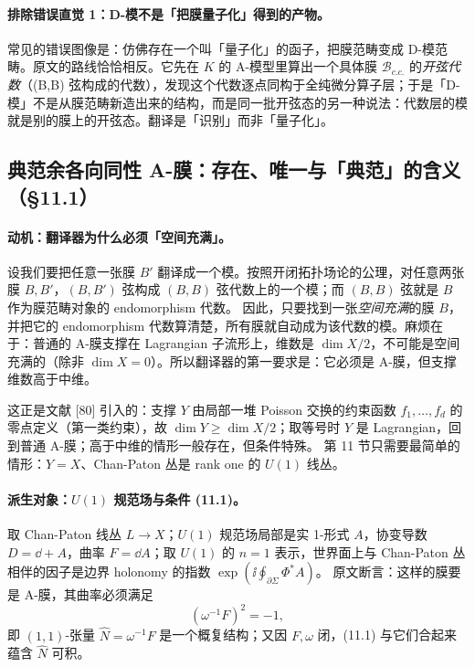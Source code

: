 \paragraph{排除错误直觉 1：D-模不是「把膜量子化」得到的产物。}常见的错误图像是：仿佛存在一个叫「量子化」的函子，把膜范畴变成 D-模范畴。原文的路线恰恰相反。它先在 \(K\) 的 A-模型里算出一个具体膜 \(\mathcal B_{c.c.}\) 的\emph{开弦代数}（(B,B) 弦构成的代数），发现这个代数逐点同构于全纯微分算子层；于是「D-模」不是从膜范畴新造出来的结构，而是同一批开弦态的另一种说法：代数层的模就是别的膜上的开弦态。翻译是「识别」而非「量子化」。\pA{}\pC{}

\subsection{典范余各向同性 A-膜：存在、唯一与「典范」的含义（\S11.1）}
\label{subsec:cc}

\paragraph{动机：翻译器为什么必须「空间充满」。}设我们要把任意一张膜 \(B'\) 翻译成一个模。按照开闭拓扑场论的公理，对任意两张膜 \(B,B'\)，\((B,B')\) 弦构成 \((B,B)\) 弦代数上的一个模；而 \((B,B)\) 弦就是 \(B\) 作为膜范畴对象的 endomorphism 代数。\pA{} 因此，只要找到一张\emph{空间充满}的膜 \(B\)，并把它的 endomorphism 代数算清楚，所有膜就自动成为该代数的模。麻烦在于：普通的 A-膜支撑在 Lagrangian 子流形上，维数是 \(\dim X/2\)，不可能是空间充满的（除非 \(\dim X=0\)）。所以翻译器的第一要求是：它必须是 A-膜，但支撑维数高于中维。

这正是文献 [80] 引入的：支撑 \(Y\) 由局部一堆 Poisson 交换的约束函数 \(f_1,\dots,f_d\) 的零点定义（第一类约束），故 \(\dim Y\ge \dim X/2\)；取等号时 \(Y\) 是 Lagrangian，回到普通 A-膜；高于中维的情形一般存在，但条件特殊。\pA{} 第 11 节只需要最简单的情形：\(Y=X\)、Chan-Paton 丛是 rank one 的 \(U(1)\) 线丛。

\paragraph{派生对象：\(U(1)\) 规范场与条件 (11.1)。}取 Chan-Paton 线丛 \(L\to X\)；\(U(1)\) 规范场局部是实 1-形式 \(A\)，协变导数 \(D=\dd+A\)，曲率 \(F=\dd A\)；取 \(U(1)\) 的 \(n=1\) 表示，世界面上与 Chan-Paton 丛相伴的因子是边界 holonomy 的指数 \(\exp(\ii\oint_{\partial\Sigma}\Phi^*A)\)。\pA{} 原文断言：这样的膜要是 A-膜，其曲率必须满足
\begin{equation}
(\omega^{-1}F)^2=-1,
\label{eq:cc-def}
\end{equation}
即 \((1,1)\)-张量 \(\hat N=\omega^{-1}F\) 是一个概复结构；又因 \(F,\omega\) 闭，(11.1) 与它们合起来蕴含 \(\hat N\) 可积。\pA{}

